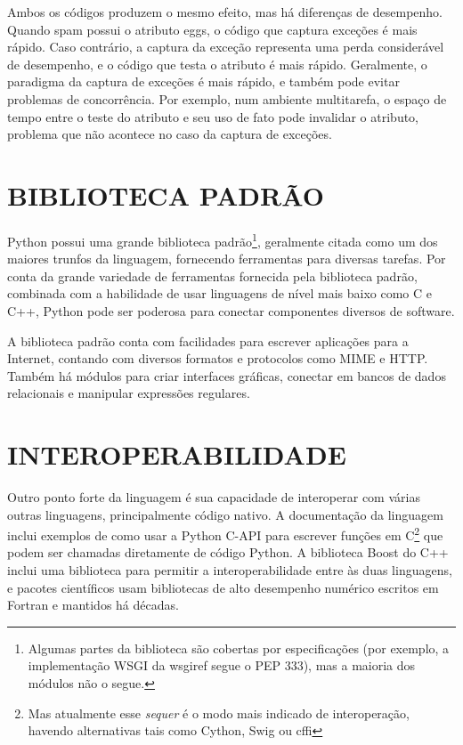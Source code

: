 \par Ambos os códigos produzem o mesmo efeito, mas há diferenças de desempenho.
Quando spam possui o atributo eggs, o código que captura exceções é mais rápido.
Caso contrário, a captura da exceção representa uma perda considerável de desempenho, e o código que testa o atributo é mais rápido.
Geralmente, o paradigma da captura de exceções é mais rápido, e também pode evitar problemas de concorrência.
Por exemplo, num ambiente multitarefa, o espaço de tempo entre o teste do atributo e seu uso de fato pode invalidar o atributo, problema que não acontece no caso da captura de exceções.

\section{BIBLIOTECA PADRÃO}
Python possui uma grande biblioteca padrão\footnote{
    Algumas partes da biblioteca são cobertas por especificações (por exemplo, a implementação WSGI da wsgiref segue o PEP 333), mas a maioria dos módulos não o segue.
}, geralmente citada como um dos maiores trunfos da linguagem, fornecendo ferramentas para diversas tarefas.
Por conta da grande variedade de ferramentas fornecida pela biblioteca padrão, combinada com a habilidade de usar linguagens de nível mais baixo como C e C++, Python pode ser poderosa para conectar componentes diversos de software.

A biblioteca padrão conta com facilidades para escrever aplicações para a Internet, contando com diversos formatos e protocolos como MIME e HTTP.
Também há módulos para criar interfaces gráficas, conectar em bancos de dados relacionais e manipular expressões regulares.

\section{INTEROPERABILIDADE}
Outro ponto forte da linguagem é sua capacidade de interoperar com várias outras linguagens, principalmente código nativo.
A documentação da linguagem inclui exemplos de como usar a Python C-API para escrever funções em C\footnote{
    Mas atualmente esse \textit{sequer} é o modo mais indicado de interoperação, havendo alternativas tais como Cython, Swig ou cffi
} que podem ser chamadas diretamente de código Python.
A biblioteca Boost do C++ inclui uma biblioteca para permitir a interoperabilidade entre às duas linguagens, e pacotes científicos usam bibliotecas de alto desempenho numérico escritos em Fortran e mantidos há décadas.

